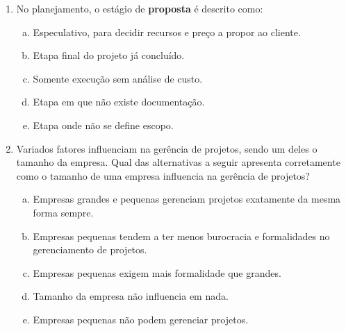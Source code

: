 \documentclass{beamer}
\begin{document}
\begin{frame}
    \begin{enumerate}
        \justifying
        \setcounter{enumi}{20}
        \item<1-2> No planejamento, o estágio de \textbf{proposta} é descrito como:
        \begin{enumerate}[a)]
            \justifying
            \item<1-2> \alert<2>{Especulativo, para decidir recursos e preço a propor ao cliente}.
            \item<1-2> Etapa final do projeto já concluído.
            \item<1-2> Somente execução sem análise de custo.
            \item<1-2> Etapa em que não existe documentação.
            \item<1-2> Etapa onde não se define escopo.
        \end{enumerate}
        \item<3-4> Variados fatores influenciam na gerência de projetos, sendo um deles o tamanho da empresa. Qual das alternativas a seguir apresenta corretamente como o tamanho de uma empresa influencia na gerência de projetos?
        \begin{enumerate}[a)]
            \justifying
            \item<3-4> Empresas grandes e pequenas gerenciam projetos exatamente da mesma forma sempre.
            \item<3-4> \alert<4>{Empresas pequenas tendem a ter menos burocracia e formalidades no gerenciamento de projetos}.
            \item<3-4> Empresas pequenas exigem mais formalidade que grandes.
            \item<3-4> Tamanho da empresa não influencia em nada.
            \item<3-4> Empresas pequenas não podem gerenciar projetos.
        \end{enumerate}
    \end{enumerate}
\end{frame}
\end{document}
